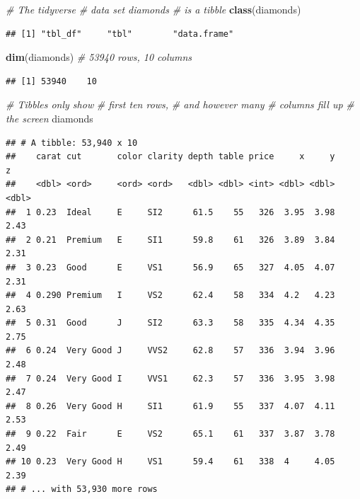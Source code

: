 \documentclass[
]{book}
\newenvironment{Shaded}{\begin{snugshade}}{\end{snugshade}}
\newcommand{\CommentTok}[1]{\textcolor[rgb]{0.56,0.35,0.01}{\textit{#1}}}
\newcommand{\KeywordTok}[1]{\textcolor[rgb]{0.13,0.29,0.53}{\textbf{#1}}}
\newcommand{\NormalTok}[1]{#1}
\begin{document}
\begin{Shaded}
\begin{Highlighting}[]
\CommentTok{# The tidyverse}
\CommentTok{# data set diamonds}
\CommentTok{# is a tibble}
\KeywordTok{class}\NormalTok{(diamonds)}
\end{Highlighting}
\end{Shaded}

\begin{verbatim}
## [1] "tbl_df"     "tbl"        "data.frame"
\end{verbatim}

\begin{Shaded}
\begin{Highlighting}[]
\KeywordTok{dim}\NormalTok{(diamonds)  }\CommentTok{# 53940 rows, 10 columns }
\end{Highlighting}
\end{Shaded}

\begin{verbatim}
## [1] 53940    10
\end{verbatim}

\begin{Shaded}
\begin{Highlighting}[]
\CommentTok{# Tibbles only show}
\CommentTok{# first ten rows,}
\CommentTok{# and however many}
\CommentTok{# columns fill up}
\CommentTok{# the screen}
\NormalTok{diamonds}
\end{Highlighting}
\end{Shaded}

\begin{verbatim}
## # A tibble: 53,940 x 10
##    carat cut       color clarity depth table price     x     y     z
##    <dbl> <ord>     <ord> <ord>   <dbl> <dbl> <int> <dbl> <dbl> <dbl>
##  1 0.23  Ideal     E     SI2      61.5    55   326  3.95  3.98  2.43
##  2 0.21  Premium   E     SI1      59.8    61   326  3.89  3.84  2.31
##  3 0.23  Good      E     VS1      56.9    65   327  4.05  4.07  2.31
##  4 0.290 Premium   I     VS2      62.4    58   334  4.2   4.23  2.63
##  5 0.31  Good      J     SI2      63.3    58   335  4.34  4.35  2.75
##  6 0.24  Very Good J     VVS2     62.8    57   336  3.94  3.96  2.48
##  7 0.24  Very Good I     VVS1     62.3    57   336  3.95  3.98  2.47
##  8 0.26  Very Good H     SI1      61.9    55   337  4.07  4.11  2.53
##  9 0.22  Fair      E     VS2      65.1    61   337  3.87  3.78  2.49
## 10 0.23  Very Good H     VS1      59.4    61   338  4     4.05  2.39
## # ... with 53,930 more rows
\end{verbatim}
\end{document}

